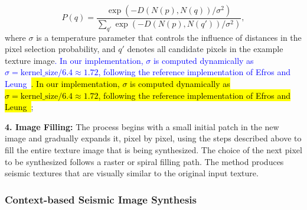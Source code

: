 \documentclass{ieeeaccess}
\providecommand{\DIFaddbegin}{} %
\providecommand{\DIFaddend}{} %
\newcommand{\DIFaddincludegraphics}[2][]{{\color{blue}\fbox{\DIFOincludegraphics[#1]{#2}}}} %
\DeclareRobustCommand{\DIFaddbegin}{\DIFOaddbegin \let\includegraphics\DIFaddincludegraphics} %
\DeclareRobustCommand{\DIFaddend}{\DIFOaddend \let\includegraphics\DIFOincludegraphics} %
\providecommand{\DIFadd}[1]{\ifmmode\textcolor{blue}{#1}\else\hl{#1}\fi}
\renewcommand{\DIFadd}[1]{\ifmmode\textcolor{blue}{#1}\else\hl{#1}\fi}
\begin{document}
\begin{equation}
P(q) = \frac{\exp(-D(N(p), N(q)) / \sigma^2)}{\sum_{q'} \exp(-D(N(p), N(q')) / \sigma^2)},
\end{equation}
where $\sigma$ is a temperature parameter that controls the influence of distances in the pixel selection probability, and $q'$ denotes all candidate pixels in the example texture image\DIFaddbegin \DIFadd{. In our implementation, $\sigma$ is computed dynamically as $\sigma = \text{kernel\_size} / 6.4 \approx 1.72$, following the reference implementation of Efros and Leung~\cite{Efros1999}}\DIFaddend ;

\textbf{4. Image Filling:} The process begins with a small initial patch in the new image and gradually expands it, pixel by pixel, using the steps described above to fill the entire texture image that is being synthesized. The choice of the next pixel to be synthesized follows a raster or spiral filling path. The method produces seismic textures that are visually similar to the original input texture. 

\subsubsection{Context-based Seismic Image Synthesis}
\end{document}
